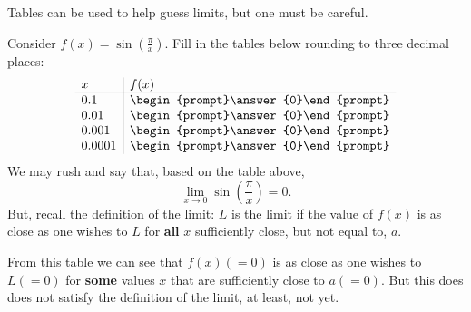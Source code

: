 \documentclass{ximera}
\begin{document}
Tables can be used to help guess limits, but one must be careful.

\begin{question}
  Consider $f(x) = \sin\left(\frac{\pi}{x}\right)$. Fill in the tables
  below rounding to three decimal places:
  \[
  \begin{array}{l|l}
    x      & f(x)      \\ \hline
    0.1   &  \begin{prompt}\answer{0}\end{prompt}\\
    0.01   & \begin{prompt}\answer{0}\end{prompt}\\
    0.001  &  \begin{prompt}\answer{0}\end{prompt}\\
    0.0001 &  \begin{prompt}\answer{0}\end{prompt}\\ 
  \end{array}
    \]
  We may rush and say that, based on the table above,
   \[
  \lim_{x\to 0}\sin\left(\frac{\pi}{x}\right)=0.
  \]
  But, recall the definition of the limit: $L$ is the limit if the value of $f(x)$ is as close as one wishes to $L$ for
  \textbf{all} $x$ sufficiently close, but not equal to, $a$. 
  
  From this table we can see that $f(x)(=0)$ is as close as one wishes to $L(=0)$ for \textbf{some} values $x$ that are sufficiently close to $a(=0)$.
  But this does does not satisfy the definition of the limit, at least, not yet.
  

\end{question}
\end{document}
